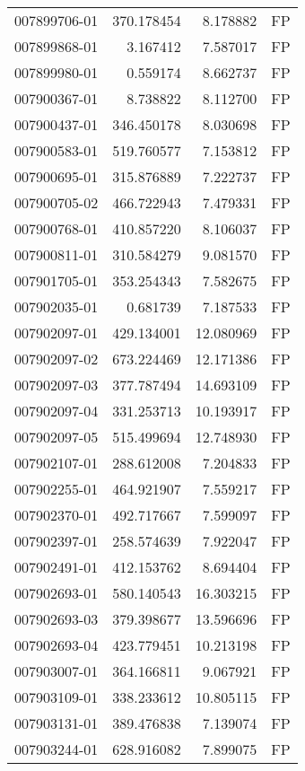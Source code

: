 \begin{tabular}{lrrl}
007899706-01 &  370.178454 &     8.178882 &   FP \\
007899868-01 &    3.167412 &     7.587017 &   FP \\
007899980-01 &    0.559174 &     8.662737 &   FP \\
007900367-01 &    8.738822 &     8.112700 &   FP \\
007900437-01 &  346.450178 &     8.030698 &   FP \\
007900583-01 &  519.760577 &     7.153812 &   FP \\
007900695-01 &  315.876889 &     7.222737 &   FP \\
007900705-02 &  466.722943 &     7.479331 &   FP \\
007900768-01 &  410.857220 &     8.106037 &   FP \\
007900811-01 &  310.584279 &     9.081570 &   FP \\
007901705-01 &  353.254343 &     7.582675 &   FP \\
007902035-01 &    0.681739 &     7.187533 &   FP \\
007902097-01 &  429.134001 &    12.080969 &   FP \\
007902097-02 &  673.224469 &    12.171386 &   FP \\
007902097-03 &  377.787494 &    14.693109 &   FP \\
007902097-04 &  331.253713 &    10.193917 &   FP \\
007902097-05 &  515.499694 &    12.748930 &   FP \\
007902107-01 &  288.612008 &     7.204833 &   FP \\
007902255-01 &  464.921907 &     7.559217 &   FP \\
007902370-01 &  492.717667 &     7.599097 &   FP \\
007902397-01 &  258.574639 &     7.922047 &   FP \\
007902491-01 &  412.153762 &     8.694404 &   FP \\
007902693-01 &  580.140543 &    16.303215 &   FP \\
007902693-03 &  379.398677 &    13.596696 &   FP \\
007902693-04 &  423.779451 &    10.213198 &   FP \\
007903007-01 &  364.166811 &     9.067921 &   FP \\
007903109-01 &  338.233612 &    10.805115 &   FP \\
007903131-01 &  389.476838 &     7.139074 &   FP \\
007903244-01 &  628.916082 &     7.899075 &   FP \\

\end{tabular}
